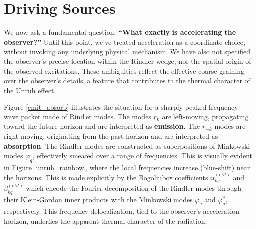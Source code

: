 \documentclass[12pt,a4paper]{article}
\begin{document}
\section{Driving Sources}

We now ask a fundamental question: {\bf ``What exactly is accelerating the observer?''} Until this point, we've treated acceleration as a coordinate choice, without invoking any underlying physical mechanism. We have also not specified the observer’s precise location within the Rindler wedge, nor the spatial origin of the observed excitations. These ambiguities reflect the effective coarse-graining over the observer's details, a feature that contributes to the thermal character of the Unruh effect.

Figure \ref{emit_absorb} illustrates the situation for a sharply peaked frequency wave packet made of Rindler modes. The modes $r_k$ are left-moving, propagating toward the future horizon and are interpreted as {\bf emission}. The $r_{-k}$ modes are right-moving, originating from the past horizon and are interpreted as {\bf absorption}. The Rindler modes are constructed as superpositions of Minkowski modes $\varphi_q$, effectively smeared over a range of frequencies. This is visually evident in Figure \ref{unruh_rainbow}, where the local frequencies increase (blue-shift) near the horizons. This is made explicitly by the Bogoliubov coefficients $\alpha_{kq}^{(cM)}$ and $\beta_{kq}^{(cM)}$ which encode the Fourier decomposition of the Rindler modes through their Klein-Gordon inner products with the Minkowski modes $\varphi_q$ and $\varphi_q^*$, respectively. This frequency delocalization, tied to the observer's acceleration horizon, underlies the apparent thermal character of the radiation.
\end{document}

